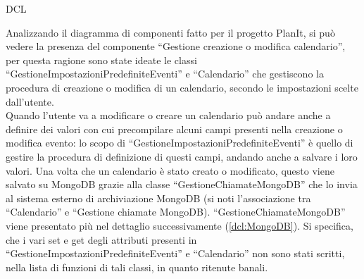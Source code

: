 \begin{listaPersonale}{DCL}
    \begin{center}
        
    \end{center}
    \newpage



    \begin{listaPersonale2}[DCL]{}

        Analizzando il diagramma di componenti fatto per il progetto PlanIt, si può vedere la presenza del componente “Gestione creazione o modifica calendario”, per questa ragione sono state ideate le classi “GestioneImpostazioniPredefiniteEventi” e “Calendario”  che gestiscono la procedura di creazione o modifica di un calendario, secondo le impostazioni scelte dall'utente. \\
        Quando l'utente va a modificare o creare un calendario può andare anche a definire dei valori con cui precompilare alcuni campi presenti nella creazione o modifica evento: lo scopo di “GestioneImpostazioniPredefiniteEventi” è quello di gestire la procedura di definizione di questi campi, andando anche a salvare i loro valori. Una volta che un calendario è stato creato o modificato, questo viene salvato su MongoDB grazie alla classe “GestioneChiamateMongoDB” che lo invia al sistema esterno di archiviazione MongoDB (si noti l'associazione tra “Calendario” e “Gestione chiamate MongoDB).
        “GestioneChiamateMongoDB” viene presentato più nel dettaglio successivamente (\ref{dcl:MongoDB}).
        Si specifica, che i vari set e get degli attributi presenti in “GestioneImpostazioniPredefiniteEventi” e “Calendario” non sono stati scritti, nella lista di funzioni di tali classi, in quanto ritenute banali.


        \begin{center}
            
        \end{center}
        \newpage



\end{listaPersonale2}
\end{listaPersonale}
